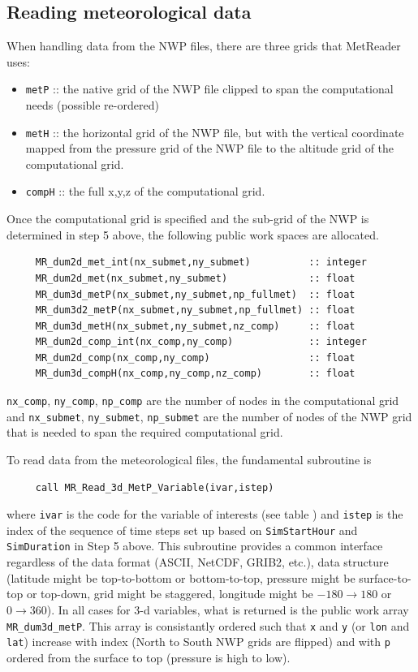 \documentclass[11pt]{article}   %
\begin{document}
\subsection{Reading meteorological data}
When handling data from the NWP files, there are three grids that MetReader uses:
\begin{itemize}
\item \texttt{metP} :: the native grid of the NWP file clipped to span the
computational needs (possible re-ordered)
\item \texttt{metH} :: the horizontal grid of the NWP file, but with the vertical
coordinate mapped from the pressure grid of the NWP file to the altitude grid of 
the computational grid.
\item \texttt{compH} :: the full x,y,z of the computational grid.
\end{itemize}
Once the computational grid is specified and the sub-grid of the NWP is determined in 
step 5 above, the following public work spaces are allocated.
\begin{verbatim}
     MR_dum2d_met_int(nx_submet,ny_submet)          :: integer
     MR_dum2d_met(nx_submet,ny_submet)              :: float
     MR_dum3d_metP(nx_submet,ny_submet,np_fullmet)  :: float
     MR_dum3d2_metP(nx_submet,ny_submet,np_fullmet) :: float
     MR_dum3d_metH(nx_submet,ny_submet,nz_comp)     :: float
     MR_dum2d_comp_int(nx_comp,ny_comp)             :: integer
     MR_dum2d_comp(nx_comp,ny_comp)                 :: float
     MR_dum3d_compH(nx_comp,ny_comp,nz_comp)        :: float
\end{verbatim}
\texttt{nx\_comp}, \texttt{ny\_comp}, \texttt{np\_comp} are the number
of nodes in the computational grid and 
\texttt{nx\_submet}, \texttt{ny\_submet}, \texttt{np\_submet} are the
number of nodes of the NWP grid that is needed
to span the required computational grid.

To read data from the meteorological files, the fundamental subroutine is
\begin{verbatim}
     call MR_Read_3d_MetP_Variable(ivar,istep)
\end{verbatim}
where \texttt{ivar} is the code for the variable of interests (see table %
) and
\texttt{istep} is the index of the sequence of time steps set up based on
\texttt{SimStartHour} and \texttt{SimDuration} in Step 5 above.  This subroutine provides
a common interface regardless of the data format (ASCII, NetCDF, GRIB2, etc.), data
structure (latitude might be top-to-bottom or bottom-to-top, pressure might be surface-to-top
or top-down, grid might be staggered, longitude might be $-180 \rightarrow 180$ or $0 \rightarrow 360$).
In all cases for 3-d variables, what is returned is the public work array
\texttt{MR\_dum3d\_metP}.
This array is consistantly ordered such that \texttt{x}
and \texttt{y} (or \texttt{lon} and \texttt{lat}) increase with index (North to South NWP grids
are flipped) and with \texttt{p} ordered from the surface to top (pressure is high to low).
\end{document}
